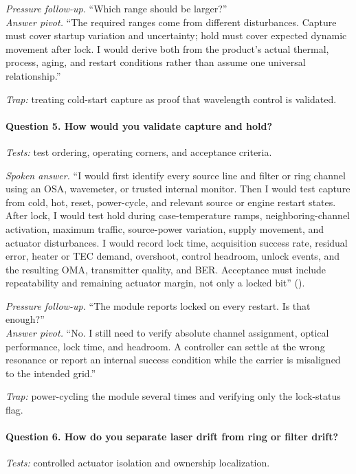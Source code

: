 \textit{Pressure follow-up.} ``Which range should be larger?''\\
\textit{Answer pivot.} ``The required ranges come from different disturbances.
Capture must cover startup variation and uncertainty; hold must cover expected
dynamic movement after lock. I would derive both from the product's actual
thermal, process, aging, and restart conditions rather than assume one universal
relationship.''

\textit{Trap:} treating cold-start capture as proof that wavelength control is
validated.

\paragraph{Question 5. How would you validate capture and hold?}
\textit{Tests:} test ordering, operating corners, and acceptance criteria.

\textit{Spoken answer.}
``I would first identify every source line and filter or ring channel using an
OSA, wavemeter, or trusted internal monitor. Then I would test capture from
cold, hot, reset, power-cycle, and relevant source or engine restart states.
After lock, I would test hold during case-temperature ramps, neighboring-channel
activation, maximum traffic, source-power variation, supply movement, and
actuator disturbances. I would record lock time, acquisition success rate,
residual error, heater or TEC demand, overshoot, control headroom, unlock
events, and the resulting OMA, transmitter quality, and BER. Acceptance must
include repeatability and remaining actuator margin, not only a locked bit''
().

\textit{Pressure follow-up.} ``The module reports locked on every restart. Is
that enough?''\\
\textit{Answer pivot.} ``No. I still need to verify absolute channel assignment,
optical performance, lock time, and headroom. A controller can settle at the
wrong resonance or report an internal success condition while the carrier is
misaligned to the intended grid.''

\textit{Trap:} power-cycling the module several times and verifying only the
lock-status flag.

\paragraph{Question 6. How do you separate laser drift from ring or filter
drift?}
\textit{Tests:} controlled actuator isolation and ownership localization.

